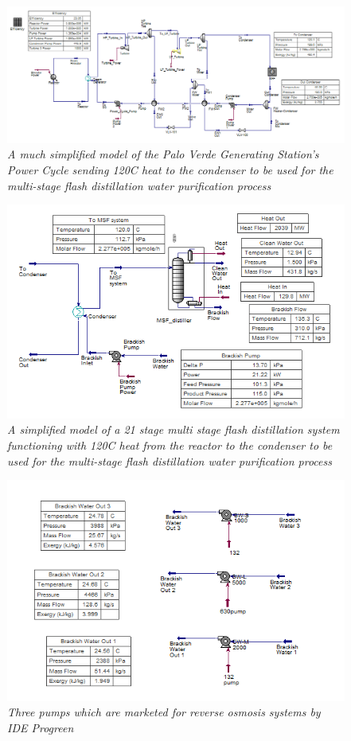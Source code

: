 \documentclass[12pt]{UIdahoMastersThesis}
\begin{document}
\begin{figure}
\includegraphics[width=\textwidth]{120PC.PNG}
\caption{\small \sl A much simplified model of the Palo Verde Generating Station's Power Cycle sending 120\degree C heat to the condenser to be used for the multi-stage flash distillation water purification process}
\end{figure}
\begin{figure}
\includegraphics[width=\textwidth]{120MSF.PNG}
\caption{\small \sl A simplified model of a 21 stage multi stage flash distillation system functioning with 120\degree C heat from the reactor to the condenser to be used for the multi-stage flash distillation water purification process}
\end{figure}
\begin{figure}
\includegraphics[width=\textwidth]{RO_3Pumps.PNG}
\caption{\small \sl Three pumps which are marketed for reverse osmosis systems by IDE Progreen}
\end{figure}
\end{document}

